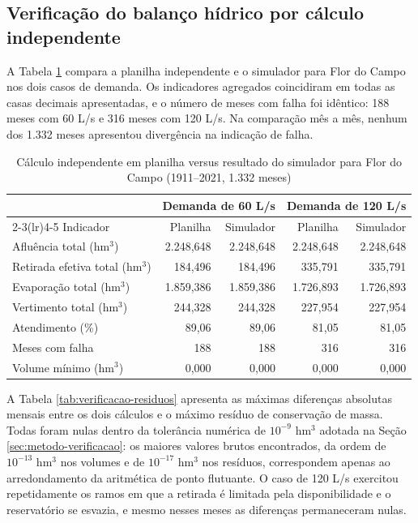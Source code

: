 \subsection{Verificação do balanço hídrico por cálculo independente}
\label{subsec:resultado-verif-balanco}

A Tabela \ref{tab:verificacao-planilha} compara a planilha independente e o simulador para Flor do Campo nos dois casos de demanda. Os indicadores agregados coincidiram em todas as casas decimais apresentadas, e o número de meses com falha foi idêntico: 188 meses com 60 L/s e 316 meses com 120 L/s. Na comparação mês a mês, nenhum dos 1.332 meses apresentou divergência na indicação de falha.

\begin{table}[!htbp]
    \captionsetup{width=15cm}
    \caption{Cálculo independente em planilha versus resultado do simulador para Flor do Campo (1911--2021, 1.332 meses)}
    \label{tab:verificacao-planilha}
    \centering
    \footnotesize
    \begin{tabular}{lrrrr}
        \toprule
         & \multicolumn{2}{c}{Demanda de 60 L/s} & \multicolumn{2}{c}{Demanda de 120 L/s} \\
        \cmidrule(lr){2-3}\cmidrule(lr){4-5}
        Indicador & Planilha & Simulador & Planilha & Simulador \\
        \midrule
        Afluência total (hm$^3$) & 2.248,648 & 2.248,648 & 2.248,648 & 2.248,648 \\
        Retirada efetiva total (hm$^3$) & 184,496 & 184,496 & 335,791 & 335,791 \\
        Evaporação total (hm$^3$) & 1.859,386 & 1.859,386 & 1.726,893 & 1.726,893 \\
        Vertimento total (hm$^3$) & 244,328 & 244,328 & 227,954 & 227,954 \\
        Atendimento (\%) & 89,06 & 89,06 & 81,05 & 81,05 \\
        Meses com falha & 188 & 188 & 316 & 316 \\
        Volume mínimo (hm$^3$) & 0,000 & 0,000 & 0,000 & 0,000 \\
        \bottomrule
    \end{tabular}
\end{table}

A Tabela \ref{tab:verificacao-residuos} apresenta as máximas diferenças absolutas mensais entre os dois cálculos e o máximo resíduo de conservação de massa. Todas foram nulas dentro da tolerância numérica de $10^{-9}$ hm$^3$ adotada na Seção \ref{sec:metodo-verificacao}: os maiores valores brutos encontrados, da ordem de $10^{-13}$ hm$^3$ nos volumes e de $10^{-17}$ hm$^3$ nos resíduos, correspondem apenas ao arredondamento da aritmética de ponto flutuante. O caso de 120 L/s exercitou repetidamente os ramos em que a retirada é limitada pela disponibilidade e o reservatório se esvazia, e mesmo nesses meses as diferenças permaneceram nulas.

